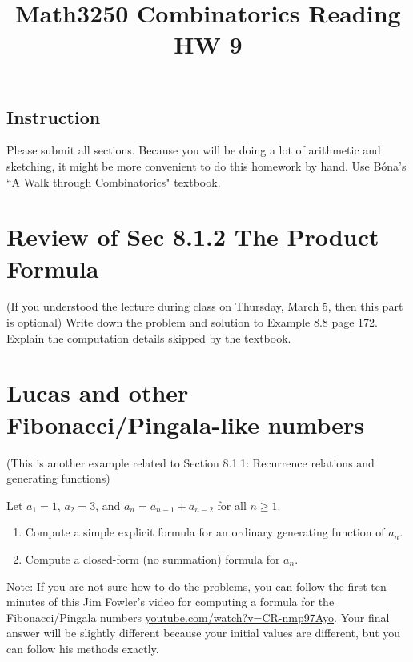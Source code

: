 \documentclass[10pt]{amsart}
\title{Math3250 Combinatorics Reading HW 9}
\begin{document}
\maketitle



\subsection*{Instruction}
Please submit all sections. 
Because you will be doing a lot of arithmetic and sketching, it might be more convenient to do this homework by hand.
Use B\'ona's ``A Walk through Combinatorics" textbook.

\bigskip


\section*{Review of Sec 8.1.2 The Product Formula}
(If you understood the lecture during class on Thursday, March 5, then this part is optional)
Write down the problem and solution to Example 8.8 page 172. Explain the computation details skipped by the textbook.


\section{Lucas and other Fibonacci/Pingala-like numbers}
(This is another example related to 	Section 8.1.1: 
	Recurrence relations and generating functions)
	
	
Let $a_1=1$, $a_2=3$, and $a_n=a_{n-1} + a_{n-2}$ for all $n \geq 1$.



\begin{enumerate}
	\item 
	Compute a simple explicit formula for an ordinary generating function of $a_n$.
	\item 
	Compute a closed-form (no summation) formula for $a_n$.
\end{enumerate}

	
Note: If you are not sure how to do the problems, you can follow the first ten minutes of this Jim Fowler's video for computing a formula for the Fibonacci/Pingala numbers \href{https://www.youtube.com/watch?v=CR-nmp97Ayo}{youtube.com/watch?v=CR-nmp97Ayo}. Your final answer will be slightly different because your initial values are different, but you can follow his methods exactly.
\end{document}
